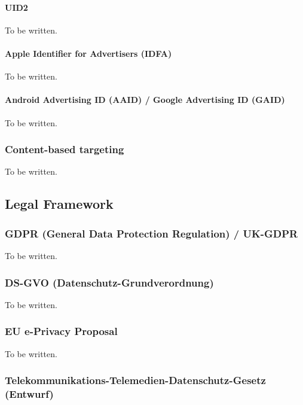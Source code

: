 \paragraph{UID2}

To be written.

\paragraph{Apple Identifier for Advertisers (IDFA)}

To be written.

\paragraph{Android Advertising ID (AAID) / Google Advertising ID (GAID)}

To be written.

\subsubsection{Content-based targeting}

To be written.

\subsection{Legal Framework}

\subsubsection{GDPR (General Data Protection Regulation) / UK-GDPR}

To be written.

\subsubsection{DS-GVO (Datenschutz-Grundverordnung)}

To be written.

\subsubsection{EU e-Privacy Proposal}

To be written.

\subsubsection{Telekommunikations-Telemedien-Datenschutz-Gesetz (Entwurf)}

